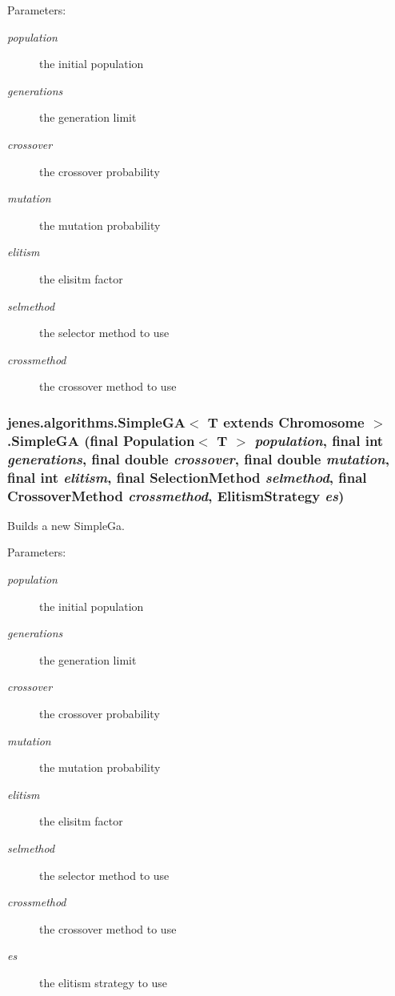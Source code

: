 \begin{Desc}
\item[Parameters:]
\begin{description}
\item[{\em population}]the initial population \item[{\em generations}]the generation limit \item[{\em crossover}]the crossover probability \item[{\em mutation}]the mutation probability \item[{\em elitism}]the elisitm factor \item[{\em selmethod}]the selector method to use \item[{\em crossmethod}]the crossover method to use \end{description}
\end{Desc}
\hypertarget{classjenes_1_1algorithms_1_1_simple_g_a_3_01_t_01extends_01_chromosome_01_4_068fcb44d18c3204fbb9b13daebd4f6d}{
\subsubsection[SimpleGA]{\setlength{\rightskip}{0pt plus 5cm}jenes.algorithms.SimpleGA$<$ T extends Chromosome $>$.SimpleGA (final Population$<$ T $>$ {\em population}, \/  final int {\em generations}, \/  final double {\em crossover}, \/  final double {\em mutation}, \/  final int {\em elitism}, \/  final {\bf SelectionMethod} {\em selmethod}, \/  final {\bf CrossoverMethod} {\em crossmethod}, \/  ElitismStrategy {\em es})}}
\label{classjenes_1_1algorithms_1_1_simple_g_a_3_01_t_01extends_01_chromosome_01_4_068fcb44d18c3204fbb9b13daebd4f6d}


Builds a new SimpleGa. 

\begin{Desc}
\item[Parameters:]
\begin{description}
\item[{\em population}]the initial population \item[{\em generations}]the generation limit \item[{\em crossover}]the crossover probability \item[{\em mutation}]the mutation probability \item[{\em elitism}]the elisitm factor \item[{\em selmethod}]the selector method to use \item[{\em crossmethod}]the crossover method to use \item[{\em es}]the elitism strategy to use \end{description}
\end{Desc}


